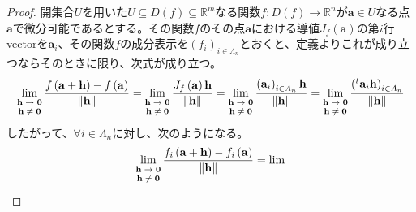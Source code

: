 \documentclass[dvipdfmx]{jsarticle}
\begin{document}
\begin{proof}
開集合$U$を用いた$U \subseteq D(f) \subseteq \mathbb{R}^{m}$なる関数$f:D(f) \rightarrow \mathbb{R}^{n}$が$\mathbf{a} \in U$なる点$\mathbf{a}$で微分可能であるとする。その関数$f$のその点$\mathbf{a}$における導値$J_{f}\left( \mathbf{a} \right)$の第$i$行vectorを$\mathbf{a}_{i}$、その関数$f$の成分表示を$\left( f_{i} \right)_{i \in \varLambda_{n}}$とおくと、定義よりこれが成り立つならそのときに限り、次式が成り立つ。
\begin{align*}
\lim_{\scriptsize \begin{matrix}
\mathbf{h} \rightarrow \mathbf{0} \\
\mathbf{h} \neq \mathbf{0} \\
\end{matrix}}\frac{f\left( \mathbf{a} + \mathbf{h} \right) - f\left( \mathbf{a} \right)}{\left\| \mathbf{h} \right\|} = \lim_{\scriptsize \begin{matrix}
\mathbf{h} \rightarrow \mathbf{0} \\
\mathbf{h} \neq \mathbf{0} \\
\end{matrix}}\frac{J_{f}\left( \mathbf{a} \right)\mathbf{h}}{\left\| \mathbf{h} \right\|} = \lim_{\scriptsize \begin{matrix}
\mathbf{h} \rightarrow \mathbf{0} \\
\mathbf{h} \neq \mathbf{0} \\
\end{matrix}}\frac{\left( \mathbf{a}_{i} \right)_{i \in \varLambda_{n}}\mathbf{h}}{\left\| \mathbf{h} \right\|} = \lim_{\scriptsize \begin{matrix}
\mathbf{h} \rightarrow \mathbf{0} \\
\mathbf{h} \neq \mathbf{0} \\
\end{matrix}}\frac{\left({}^{t}\mathbf{a}_{i}\mathbf{h} \right)_{i \in \varLambda_{n}}}{\left\| \mathbf{h} \right\|}
\end{align*}
したがって、$\forall i \in \varLambda_{n}$に対し、次のようになる。
\begin{align*}
\lim_{\scriptsize \begin{matrix}
\mathbf{h} \rightarrow \mathbf{0} \\
\mathbf{h} \neq \mathbf{0} \\
\end{matrix}}\frac{f_{i}\left( \mathbf{a} + \mathbf{h} \right) - f_{i}\left( \mathbf{a} \right)}{\left\| \mathbf{h} \right\|} = \lim_{\scriptsize \begin{matrix}

\end{matrix}}
\end{align*}
\end{proof}
\end{document}
